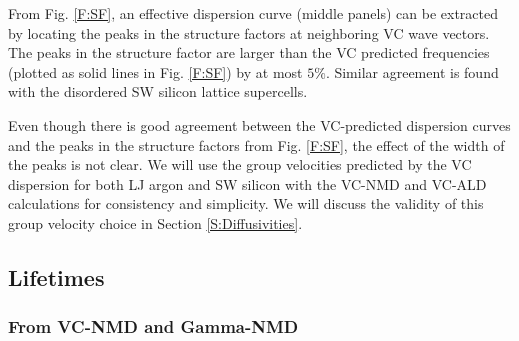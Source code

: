 \documentclass[aps,prb,onecolumn,preprint,footinbib,superscriptaddress,amsmath,amssymb,floatfix]{revtex4}
\begin{document}
From Fig. \ref{F:SF}, 
an effective dispersion curve (middle panels) can be extracted by 
locating the peaks in the 
structure factors at neighboring VC wave vectors. 
The peaks in the structure factor are larger 
than the VC predicted frequencies (plotted as solid lines in 
Fig. \ref{F:SF}) 
by at most $5\%$. Similar agreement is found with the disordered 
SW silicon lattice supercells.

Even though there is good agreement between the VC-predicted 
dispersion curves and the peaks in the structure factors from 
Fig. \ref{F:SF}, the effect of the width of the peaks is not clear. 
We will use the group velocities predicted by the VC dispersion for 
both LJ argon and SW silicon with the VC-NMD and VC-ALD calculations 
for consistency and simplicity. We will discuss the validity of this 
group velocity choice in Section \ref{S:Diffusivities}. 



\clearpage

\subsection{\label{S:Phonon Lifetimes}Lifetimes}

\subsubsection{\label{S:From VC Gamma}From VC-NMD and Gamma-NMD}
\end{document}
